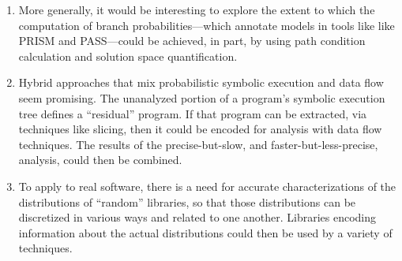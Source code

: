 \begin{enumerate}
\item More generally, it would be interesting to explore the extent
to which the computation of branch probabilities---which annotate
models in tools like like PRISM and PASS---could be achieved,
in part, by using path condition calculation and solution
space quantification.

\item Hybrid approaches that mix probabilistic symbolic execution
and data flow seem promising.  The unanalyzed portion of a program's
symbolic execution tree defines a ``residual'' program.  If that
program can be extracted, via techniques like slicing, then it
could be encoded for analysis with data flow techniques.  The
results of the precise-but-slow, and faster-but-less-precise,
analysis, could then be combined. 

\item To apply to real software, there is a need for accurate characterizations
of the distributions of ``random'' libraries, so that those distributions 
can be discretized in various ways and related to one another.  Libraries
encoding information about the actual distributions could then be used
by a variety of techniques.

\end{enumerate}
